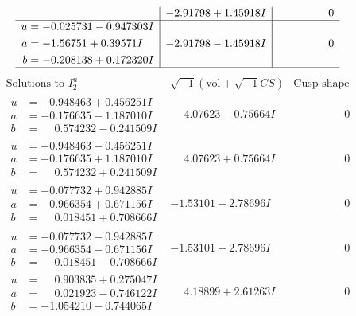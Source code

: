 \documentclass[1p]{elsarticle_modified}
\theoremstyle{definition}
\newcommand{\I}{\sqrt{-1}}
\begin{document}
$$\begin{array}{c|c|c}
 & -2.91798 + 1.45918 I & \phantom{-0.000000 } 0 \\ \hline\begin{aligned}
u &= -0.025731 - 0.947303 I \\
a &= -1.56751 + 0.39571 I \\
b &= -0.208138 + 0.172320 I\end{aligned}
 & -2.91798 - 1.45918 I & \phantom{-0.000000 } 0\\
 \hline 
 \end{array}$$\newpage$$\begin{array}{c|c|c}  
\text{Solutions to }I^u_{2}& \I (\text{vol} + \sqrt{-1}CS) & \text{Cusp shape}\\
 \hline 
\begin{aligned}
u &= -0.948463 + 0.456251 I \\
a &= -0.176635 - 1.187010 I \\
b &= \phantom{-}0.574232 - 0.241509 I\end{aligned}
 & \phantom{-}4.07623 - 0.75664 I & \phantom{-0.000000 } 0 \\ \hline\begin{aligned}
u &= -0.948463 - 0.456251 I \\
a &= -0.176635 + 1.187010 I \\
b &= \phantom{-}0.574232 + 0.241509 I\end{aligned}
 & \phantom{-}4.07623 + 0.75664 I & \phantom{-0.000000 } 0 \\ \hline\begin{aligned}
u &= -0.077732 + 0.942885 I \\
a &= -0.966354 + 0.671156 I \\
b &= \phantom{-}0.018451 + 0.708666 I\end{aligned}
 & -1.53101 - 2.78696 I & \phantom{-0.000000 } 0 \\ \hline\begin{aligned}
u &= -0.077732 - 0.942885 I \\
a &= -0.966354 - 0.671156 I \\
b &= \phantom{-}0.018451 - 0.708666 I\end{aligned}
 & -1.53101 + 2.78696 I & \phantom{-0.000000 } 0 \\ \hline\begin{aligned}
u &= \phantom{-}0.903835 + 0.275047 I \\
a &= \phantom{-}0.021923 - 0.746122 I \\
b &= -1.054210 - 0.744065 I\end{aligned}
 & \phantom{-}4.18899 + 2.61263 I & \phantom{-0.000000 } 0 \\ \hline\begin{aligned}

\end{aligned}
\end{array}$$
\end{document}
